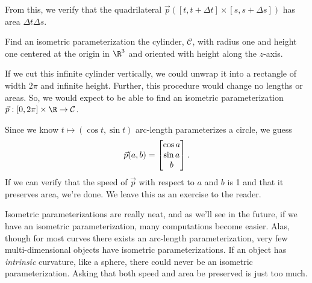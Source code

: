 \begin{example}
\begin{center}
	\end{center}

	From this, we verify that the quadrilateral $\vec p([t,t+\Delta t]\times[s,s+\Delta s])$ has area $\Delta t\Delta s$.
\end{example}

\begin{example}
	Find an isometric parameterization the cylinder, $\mathcal C$, with radius one and height one centered at
	the origin in $\R^3$ and oriented with height along the $z$-axis.

	If we cut this infinite cylinder vertically, we could unwrap it into
	a rectangle of width $2\pi$ and infinite height.  Further, this procedure would
	change no lengths or areas.  So, we would expect to be able to find an isometric
	parameterization $\vec p:[0,2\pi]\times\R\to\mathcal C$.

	Since we know $t\mapsto (\cos t,\sin t)$ arc-length parameterizes a circle, we guess
	\[
		\vec p(a,b) = \begin{bmatrix}\cos a\\\sin a\\b\end{bmatrix}.
	\]
	If we can verify that the speed of $\vec p$ with respect to $a$ and $b$ is 1 and that
	it preserves area, we're done.  We leave this as an exercise to the reader.
\end{example}

Isometric parameterizations are really neat, and as we'll see in the future, if we have an isometric
parameterization, many computations become easier.  Alas, though for most curves there exists
an arc-length parameterization, very few multi-dimensional objects have isometric parameterizations.
If an object has \emph{intrinsic} curvature, like a sphere, there could never be an isometric parameterization.
Asking that both speed and area be preserved is just too much.

